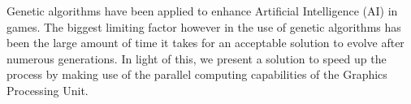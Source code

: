 \begin{thesisabstract}
Genetic algorithms have been applied to enhance Artificial Intelligence (AI) in games. The biggest
limiting factor however in the use of genetic algorithms has been the large amount of 
time it takes for an acceptable solution to evolve after numerous generations.
In light of this, we present a solution to speed up the process by making use of the
parallel computing capabilities of the Graphics Processing Unit.
\end{thesisabstract}